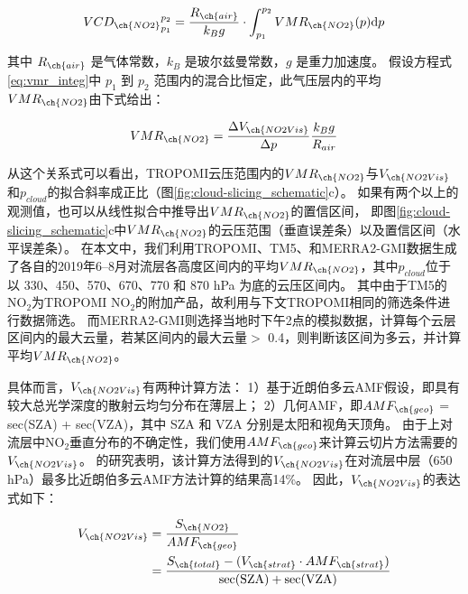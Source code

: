 \begin{equation} \label{eq:vmr_integ}
{VCD_{\ch{NO2}}}_{p_1}^{p_2}=\frac{R_{\ch{air}}}{k_Bg} \cdot \int_{p_1}^{p_2} VMR_{\ch{NO2}}(p) \mathrm{d} p
\end{equation}

其中 $R_{\ch{air}}$ 是气体常数，$k_B$ 是玻尔兹曼常数，$g$ 是重力加速度。
假设方程式\ref{eq:vmr_integ}中 $p_1$ 到 $p_2$ 范围内的混合比恒定，此气压层内的平均$VMR_{\ch{NO2}}$由下式给出：

\begin{equation}
VMR_{\ch{NO2}} = \frac{\Delta V_{\ch{NO2Vis}}}{\Delta p} \frac{k_B g}{R_{air}}
\end{equation}

从这个关系式可以看出，TROPOMI云压范围内的$VMR_{\ch{NO2}}$与$V_{\ch{NO2Vis}}$和$p_{cloud}$的拟合斜率成正比（图\ref{fig:cloud-slicing_schematic}c）。
如果有两个以上的观测值，也可以从线性拟合中推导出$VMR_{\ch{NO2}}$的置信区间，
即图\ref{fig:cloud-slicing_schematic}c中$VMR_{\ch{NO2}}$的云压范围（垂直误差条）以及置信区间（水平误差条）。
在本文中，我们利用TROPOMI、TM5、和MERRA2-GMI数据生成了各自的2019年6--8月对流层各高度区间内的平均$VMR_{\ch{NO2}}$，其中$p_{cloud}$位于以 330、450、570、670、770 和 870 hPa 为底的云压区间内。
其中由于TM5的NO$_2$为TROPOMI NO$_2$的附加产品，故利用与下文TROPOMI相同的筛选条件进行数据筛选。
而MERRA2-GMI则选择当地时下午2点的模拟数据，计算每个云层区间内的最大云量，若某区间内的最大云量$>$ 0.4，则判断该区间为多云，并计算平均$VMR_{\ch{NO2}}$。

具体而言，$V_{\ch{NO2Vis}}$有两种计算方法：
1）基于近朗伯多云AMF假设，即具有较大总光学深度的散射云均匀分布在薄层上\citep{Choi.2014}；
2）几何AMF，即$AMF_{\ch{geo}}$ = sec(SZA) + sec(VZA)，其中 SZA 和 VZA 分别是太阳和视角天顶角\citep{Marais.2018,Marais.2021}。
由于上对流层中NO$_2$垂直分布的不确定性\citep{Travis.2016}，我们使用$AMF_{\ch{geo}}$来计算云切片方法需要的$V_{\ch{NO2Vis}}$。
\citet{Choi.2014}的研究表明，该计算方法得到的$V_{\ch{NO2Vis}}$在对流层中层（650 hPa）最多比近朗伯多云AMF方法计算的结果高14\%。
因此，$V_{\ch{NO2Vis}}$的表达式如下：

\begin{equation}
\begin{split}
V_{\ch{NO2Vis}} & = \frac{S_{\ch{NO2}}}{AMF_{\ch{geo}}} \\
             & = \frac{S_{\ch{total}}-(V_{\ch{strat}} \cdot AMF_{\ch{strat}})}{\sec (\mathrm{SZA})+\sec (\mathrm{VZA})}
\end{split}
\end{equation}

